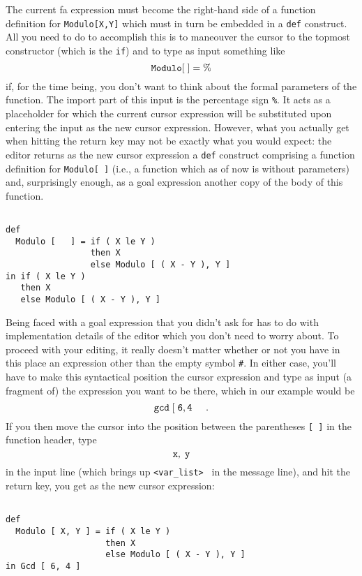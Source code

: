 The current {\sc fa} expression must become the right-hand
side of a function definition for {\tt Modulo[X,Y]} which must
in turn be embedded in a {\tt def} construct.
All you need to do to accomplish this is to maneouver the cursor to
the topmost constructor (which is the {\tt if}) and
 to type as input something like
$$
{\tt Modulo [\;] = \%}
$$
 if, for the time being, you don't want to think about
the formal parameters of the function. The import part of this input is the
percentage sign {\tt \%}. It acts as a {\mys placeholder} for which the current
 cursor expression will be substituted  upon entering 
 the input
 as the new cursor expression. 
However, what you actually get when hitting the return key may not be exactly
what you would expect: the editor returns as the new cursor expression a
{\tt def} construct comprising a function definition for {\tt Modulo[ ]}
(i.e., a function which as of now is without parameters) and, surprisingly enough, as a goal
expression another copy of the body of this function. 
\begin{verbatim}

def 
  Modulo [   ] = if ( X le Y )
                 then X
                 else Modulo [ ( X - Y ), Y ]
in if ( X le Y )
   then X
   else Modulo [ ( X - Y ), Y ]

\end{verbatim}
Being faced with a goal expression that you didn't ask for has to
 do with implementation details of the editor which you don't need
 to worry about. To proceed with your editing, it really doesn't matter
whether or not you have in this place an expression other than the empty
symbol {\tt \#}. In either case, you'll have to make this syntactical
position the cursor expression and type as input (a fragment of) the expression
you want to be there, which in our example would be
$$
 {\tt gcd\; [\; 6, 4  }\;\;\;\;\;                         . 
$$
If you then move the cursor into the position between the parentheses
{\tt [ ]} in the function header, type
$$
 {\tt x,\; y}
$$
 in the input line
(which brings up {\tt <var\_list> } in the message line), and hit the return
key, you get as the new cursor expression:
\begin{verbatim}

def 
  Modulo [ X, Y ] = if ( X le Y )
                    then X
                    else Modulo [ ( X - Y ), Y ]
in Gcd [ 6, 4 ]

\end{verbatim}

